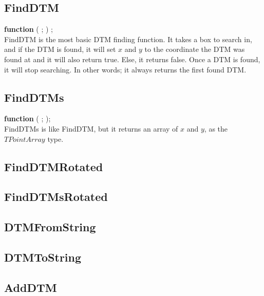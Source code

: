 \documentclass[a4paper]{report}
\begin{document}
\subsection{FindDTM}

\textbf{function} {\color{blue}{FindDTM}}({\color{typeRed}{DTM: }}
{\color{typeGreen}{Integer}}; {\color{typeRed}{Var x, y: }}
{\color{typeGreen}{Integer}}) {\color{typeGreen}{: Boolean}}; \\ 

FindDTM is the most basic DTM finding function. It takes a box to search in,
and if the DTM is found, it will set $x$ and $y$ to the coordinate the DTM
was found at and it will also return true. Else, it returns false.
Once a DTM is found, it will stop searching. In other words; it always returns
the first found DTM.

\subsection{FindDTMs}

\textbf{function} {\color{blue}{FindDTMs}}({\color{typeRed}{DTM: }}
{\color{typeGreen}{Integer}}; {\color{typeRed}{Var Points: }}
{\color{typeGreen}{TPointArray}}){\color{typeGreen}{: Boolean}}; \\

FindDTMs is like FindDTM, but it returns an array of $x$ and $y$, as the
$TPointArray$ type.

\subsection{FindDTMRotated}

\subsection{FindDTMsRotated}

\subsection{DTMFromString}

\subsection{DTMToString}

\subsection{AddDTM}
\end{document}
